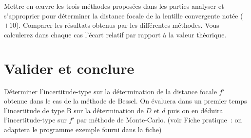 \documentclass[a4paper, 12pt, final, garamond]{book}
\begin{document}
Mettre en œuvre les trois méthodes proposées dans les parties analyser et
s'approprier pour déterminer la distance focale de la lentille convergente notée
($+10$). Comparer les résultats obtenus par les différentes méthodes. Vous
calculerez dans chaque cas l'écart relatif par rapport à la valeur théorique. 


\section{Valider et conclure}

Déterminer l'incertitude-type sur la détermination de la distance focale $f'$
obtenue dans le cas de la méthode de Bessel. On évaluera dans un premier temps
l'incertitude de type B sur la détermination de $D$ et $d$ puis on en déduira
l'incertitude-type sur $f'$ par méthode de Monte-Carlo. (voir Fiche pratique~:
on adaptera le programme exemple fourni dans la fiche)

% 
\end{document}
